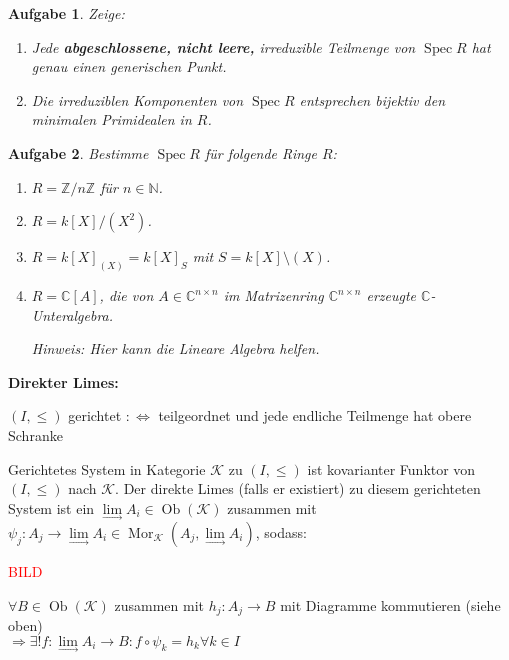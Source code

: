 \documentclass[a4paper,12pt]{report}
\theoremstyle{break}
\newtheorem{Aufg}{Aufgabe}
\theoremstyle{nonumberbreak}
\theoremstyle{nonumberplain}
\DeclareMathOperator{\Mor}{Mor}
\DeclareMathOperator{\Spec}{Spec}
\DeclareMathOperator{\Ob}{Ob}
\newcommand{\C}{\mathbb{C}}
\newcommand{\N}{\mathbb{N}}
\newcommand{\Z}{\mathbb{Z}}
\begin{document}
\begin{Aufg}
 Zeige:
\begin{enumerate}%
 \item Jede \textbf{abgeschlossene, nicht leere,} irreduzible Teilmenge von $\Spec R$ hat genau einen generischen Punkt.
 \item Die irreduziblen Komponenten von $\Spec R$ entsprechen bijektiv den minimalen Primidealen in $R$.
\end{enumerate}
\end{Aufg}

\begin{Aufg}
 Bestimme $\Spec R$ für folgende Ringe $R$:
\begin{enumerate}%
 \item $R = \Z/n\!\Z$ für $n\in \N$.
 \item $R = k[X]/(X^2)$.
 \item $R = k[X]_{(X)} = k[X]_S$ mit $S = k[X]\setminus(X)$.
 \item $R = \C[A]$, die von $A\in \C^{n\times n}$ im Matrizenring $\C^{n\times n}$ erzeugte $\C$-Unteralgebra.
 
 \textit{Hinweis: Hier kann die Lineare Algebra helfen.}
\end{enumerate}
\end{Aufg}

\textbf{Direkter Limes:}

$(I, \le)$ gerichtet $:\Leftrightarrow$ teilgeordnet und jede endliche Teilmenge hat obere Schranke

Gerichtetes System in Kategorie $\mathcal K$ zu $(I, \le)$ ist kovarianter Funktor von $(I, \le)$ nach $\mathcal K$. Der direkte Limes (falls er existiert) zu diesem gerichteten System ist ein $\lim\limits_\to A_i \in \Ob(\mathcal K)$ zusammen mit $\psi_j: A_{j} \to \lim\limits_\to A_i \in \Mor_{\mathcal K}(A_{j}, \lim\limits_\to A_i)$,  sodass:\\
\begin{center}
\textcolor{red}{BILD}
\end{center}
$\forall B \in \Ob(\mathcal K)$ zusammen mit $h_{j}: A_{j} \to B $ mit Diagramme kommutieren (siehe oben)\\
$\Rightarrow \exists! f: \lim\limits_\to A_i \to B : f \circ \psi_k = h_k \forall k \in I$
\end{document}
